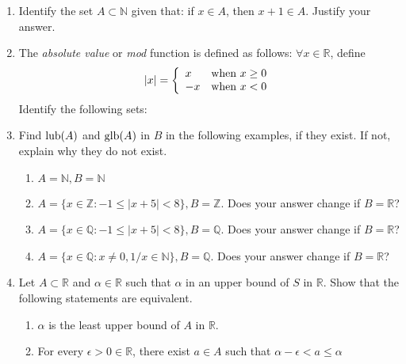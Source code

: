 \begin{enumerate}[label = (\arabic*)]
    \item Identify the set $A\subset \mathbb{N}$ given that: if $x \in A$, then $x+1\in A$. Justify your answer.
    \item The \textit{absolute value} or \textit{mod} function is defined as follows: $\forall x \in \mathbb{R}$, define
    \[ |x| = \left\{
        \begin{array}{l l}
            x & \text{when } x \ge 0 \\
            -x & \text{when } x < 0 
        \end{array}
    \right. \]
    Identify the following sets:\\
    \item Find $\operatorname{lub}(A)$ and $\operatorname{glb}(A)$ in $B$ in the following examples, if they exist. If not, explain why they do not exist.
    \begin{enumerate}[nosep]
        \item $A=\mathbb{N}, B=\mathbb{N}$
        \item $A = \{x\in\mathbb{Z} : -1 \le |x+5| < 8\}, B = \mathbb{Z}$. Does your answer change if $B=\mathbb{R}$?
        \item $A = \{x\in\mathbb{Q} : -1 \le |x+5| < 8\}, B = \mathbb{Q}$. Does your answer change if $B=\mathbb{R}$?
        \item $A = \{x\in\mathbb{Q} : x\neq0, 1/x \in \mathbb{N}\}, B = \mathbb{Q}$. Does your answer change if $B=\mathbb{R}$?
    \end{enumerate}
    \item Let $A\subset\mathbb{R}$ and $\alpha \in \mathbb{R}$ such that $\alpha$ in an upper bound of $S$ in $\mathbb{R}$. Show that the following statements are equivalent.
    \begin{enumerate}[nosep]
        \item $\alpha$ is the least upper bound of $A$ in $\mathbb{R}$.
        \item For every $\epsilon > 0 \in \mathbb{R}$, there exist $a \in A$ such that $\alpha - \epsilon < a \le \alpha$

\end{enumerate}
\end{enumerate}
